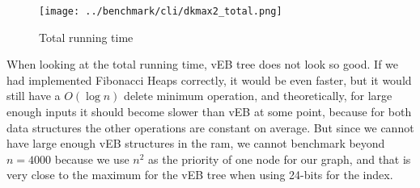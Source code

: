 \begin{figure}[htb]
\centering
\texttt{[image: ../benchmark/cli/dkmax2\_total.png]}
\caption{Total running time}
\label{fig:dkmax2-tot}
\end{figure}

When looking at the total running time, vEB tree does not look so good. If we had implemented Fibonacci Heaps correctly, it would be even faster, but it would still have a $O(\log n)$ delete minimum operation, and theoretically, for large enough inputs it should become slower than vEB at some point, because for both data structures the other operations are constant on average. But since we cannot have large enough vEB structures in the ram, we cannot benchmark beyond $n=4000$ because we use $n^2$ as the priority of one node for our graph, and that is very close to the maximum for the vEB tree when using 24-bits for the index.
